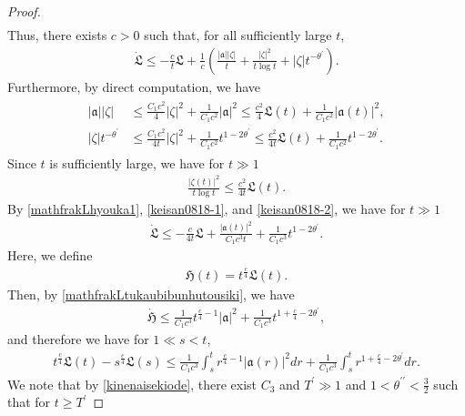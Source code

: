 \documentclass[10pt,a4paper]{amsart}
\numberwithin{equation}{section}
\begin{document}
\begin{proof}
\begin{align*}
\end{align*}
Thus, there exists $c>0$ such that, for all sufficiently large $t$,
\begin{align}\label{mathfrakLhyouka1}
\dot{\mathfrak{L}}\leq -\frac{c}{t}\mathfrak{L}+\frac{1}{c}\left(\frac{|\mathfrak{a}||\zeta|}{t}+\frac{|\zeta|^2}{t\log{t}}+|\zeta|t^{-\theta^{\prime}}\right).
\end{align}
Furthermore, by direct computation, we have
\begin{align}\label{keisan0818-1}
\begin{aligned}
|\mathfrak{a}||\zeta|&\leq \frac{C_1c^2}{4}|\zeta|^2+\frac{1}{C_1c^2}|\mathfrak{a}|^2\leq \frac{c^2}{4}\mathfrak{L}(t)+\frac{1}{C_1c^2}|\mathfrak{a}(t)|^2,
\\
|\zeta|t^{-\theta^{\prime}}&\leq \frac{C_1c^2}{4t}|\zeta |^2+\frac{1}{C_1c^2}t^{1-2\theta^{\prime}}\leq \frac{c^2}{4t}\mathfrak{L}(t)+\frac{1}{C_1c^2}t^{1-2\theta^{\prime}}.
\end{aligned}
\end{align}
Since $t$ is sufficiently large, we have for $t\gg 1$
\begin{align}\label{keisan0818-2}
\frac{|\zeta(t)|^2}{t\log{t}}\leq \frac{c^2}{4t}\mathfrak{L}(t).
\end{align}
By \eqref{mathfrakLhyouka1}, \eqref{keisan0818-1}, and \eqref{keisan0818-2}, we have for $t\gg 1$
\begin{align}\label{mathfrakLtukaubibunhutousiki}
\dot{\mathfrak{L}}\leq -\frac{c}{4t}\mathfrak{L}+\frac{|\mathfrak{a}(t)|^2}{C_1c^3t}+\frac{1}{C_1c^3}t^{1-2\theta^{\prime}}.
\end{align}
Here, we define
\begin{align}\label{mathfrakHdef}
\mathfrak{H}(t)=t^{\frac{c}{4}}\mathfrak{L}(t).
\end{align}
Then, by \eqref{mathfrakLtukaubibunhutousiki}, we have
\begin{align*}
\dot{\mathfrak{H}}\leq \frac{1}{C_1c^3}t^{\frac{c}{4}-1}|\mathfrak{a}|^2+\frac{1}{C_1c^3}t^{1+\frac{c}{4}-2\theta^{\prime}},
\end{align*}
and therefore we have for $1\ll s<t$,
\begin{align}\label{mathfrakLnojunbi}
t^{\frac{c}{4}}\mathfrak{L}(t)-s^{\frac{c}{4}}\mathfrak{L}(s)\leq \frac{1}{C_1c^3}\int_s^t r^{\frac{c}{4}-1}|\mathfrak{a}(r)|^2dr+\frac{1}{C_1c^3}\int_s^t r^{1+\frac{c}{4}-2\theta^{\prime}}dr.
\end{align}
We note that by \eqref{kinenaisekiode}, there exist $C_3$ and $T^{\prime}\gg 1$ and $1<\theta^{\prime \prime}<\frac{3}{2}$ such that for $t\geq T^{\prime}$

\end{proof}
\end{document}
